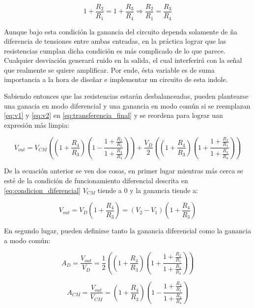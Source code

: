 \begin{equation}\label{eq:condicion_diferencial}
1 + \frac{R_2}{R_1} = 1 + \frac{R_3}{R_4} \Rightarrow \boxed{\frac{R_2}{R_1} = \frac{R_3}{R_4}}
\end{equation}

Aunque bajo esta condición la ganancia del circuito dependa solamente de ña diferencia de tensiones entre ambas entradas, en la práctica lograr que las resistencias cumplan dicha condición es más complicado de lo que parece. Cualquier desviación generará ruido en la salida, el cual interferirá con la señal que realmente se quiere amplificar. Por ende, ésta variable es de suma importancia a la hora de diseñar e implementar un circuito de esta indole. 

Sabiendo entonces que las resistencias estarán desbalanceadas, pueden plantearse una ganacia en modo diferencial y una ganancia en modo común si se reemplazan \ref{eq:v1} y \ref{eq:v2} en \ref{eq:transferencia_final} y se reordena para lograr uan expresión más limpia:

\begin{equation}\label{eq:ganancias_no_ideales}
V_{out} = V_{CM}((1 + \frac{R_4}{R_3})(1 - \frac{1 + \frac{R_2}{R_1}}{1 + \frac{R_3}{R_4}})) + \frac{V_D}{2}((1 + \frac{R_4}{R_3})(1 + \frac{1 + \frac{R_2}{R_1}}{1 + \frac{R_3}{R_4}}))
\end{equation}

De la ecuación anterior se ven dos cosas, en primer lugar mientras más cerca se esté de la condición de funcionamiento diferencial descrita en \ref{eq:condicion_diferencial} $V_{CM}$ tiende a 0 y la ganancia tiende a:

\begin{equation}\label{ganancia_diferencial_ideal}
\boxed{V_{out} = V_D(1 + \frac{R_4}{R_3}) = (V_2 - V_1)(1 + \frac{R_4}{R_3})}
\end{equation}


En segundo lugar, pueden definirse tanto la ganancia diferencial como la ganancia a modo común:

\begin{equation}\label{eq:ganancia_diferencial}
A_D = \frac{V_{out}}{V_D} = \frac{1}{2}((1 + \frac{R_4}{R_3})(1 + \frac{1 + \frac{R_2}{R_1}}{1 + \frac{R_3}{R_4}}))
\end{equation}

\begin{equation}\label{eq:ganancia_comun}
A_{CM} = \frac{V_{out}}{V_{CM}} = (1 + \frac{R_4}{R_3})(1 - \frac{1 + \frac{R_2}{R_1}}{1 + \frac{R_3}{R_4}})
\end{equation}

